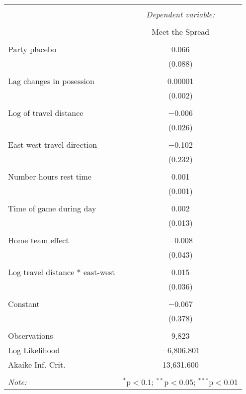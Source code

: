 \documentclass[letterpaper,12pt]{article}
\begin{document}
\begin{tabular}{@{\extracolsep{5pt}}lc}  \\[-1.8ex]\hline  \hline \\[-1.8ex]   & \multicolumn{1}{c}{\textit{Dependent variable:}} \\  \cline{2-2}  \\[-1.8ex] & Meet the Spread \\  \hline \\[-1.8ex]   Party placebo & 0.066 \\    & (0.088) \\    & \\   Lag changes in posession & 0.00001 \\    & (0.002) \\    & \\   Log of travel distance & $-$0.006 \\    & (0.026) \\    & \\   East-west travel direction & $-$0.102 \\    & (0.232) \\    & \\   Number hours rest time & 0.001 \\    & (0.001) \\    & \\   Time of game during day & 0.002 \\    & (0.013) \\    & \\   Home team effect & $-$0.008 \\    & (0.043) \\    & \\   Log travel distance * east-west & 0.015 \\    & (0.036) \\    & \\   Constant & $-$0.067 \\    & (0.378) \\  \hline \\[-1.8ex]  Observations & 9,823 \\  Log Likelihood & $-$6,806.801 \\  Akaike Inf. Crit. & 13,631.600 \\  \hline  \hline \\[-1.8ex]  \textit{Note:}  & \multicolumn{1}{r}{$^{*}$p$<$0.1; $^{**}$p$<$0.05; $^{***}$p$<$0.01} \\  \end{tabular} 
\end{document}
